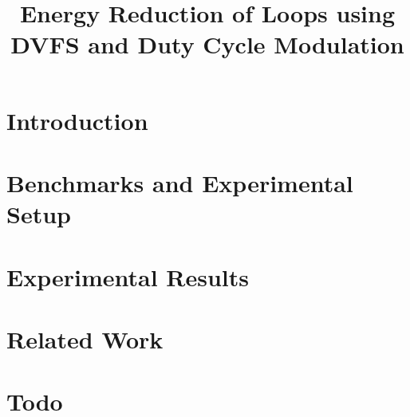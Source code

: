 \documentclass[10pt,conference,letterpaper]{IEEEtran}
\title{Energy Reduction of Loops using DVFS and Duty Cycle Modulation}
\begin{document}
\maketitle



\section{Introduction}
\label{sec:intro}


\section{Benchmarks and Experimental Setup}
\label{sec:benchmarks}

\label{sec:setup}


\section{Experimental Results}
\label{sec:results}



\section{Related Work}
\label{sec:related}


\section {Todo}
\label{sec:conclusion}






\end{document}
